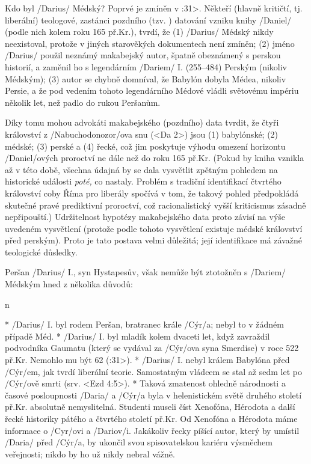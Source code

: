 
 {Kdo byl \x/Darius/ Médský?}
Poprvé je zmíněn v :31>. Někteří (hlavně kritičtí, tj. liberální) teologové, zastánci pozdního (tzv. ) datování vzniku knihy \x/Daniel/ (podle nich kolem roku 165 př.Kr.),  tvrdí, že
(1) \x/Darius/ Médský nikdy neexistoval, protože v jiných starověkých dokumentech není zmíněn; (2) jméno \x/Darius/ použil neznámý makabejský autor, špatně obeznámený s perskou
historií, a zaměnil ho s legendárním \x/Dariem/ I. (255--484) Perským (nikoliv Médským); (3) autor se chybně domníval, že Babylón dobyla Médea, nikoliv Persie, a že pod vedením tohoto
legendárního  Médové vládli světovému impériu několik let, než padlo do rukou Peršanům.

Díky tomu mohou advokáti makabejského (pozdního) data tvrdit, že čtyři království z \x/Nabuchodonozor/ova snu (<Da 2>) jsou (1) babylónské; (2) médské; (3) perské a (4) řecké, což
jim poskytuje výhodu omezení horizontu \x/Daniel/ových proroctví ne dále než do roku 165 př.Kr. (Pokud by kniha vznikla až v této době, všechna údajná   by se dala vysvětlit zpětným pohledem na historické události {\it poté,\/} co nastaly. Problém s tradiční identifikací čtvrtého království coby Říma pro liberály spočívá v tom, že takový pohled předpokládá skutečné pravé prediktivní proroctví, což racionalistický vyšší kriticismus zásadně nepřipouští.)
Udržitelnost hypotézy makabejského data proto závisí na výše uvedeném vysvětlení  (protože podle tohoto vysvětlení existuje médské království před perským).
Proto je tato postava velmi důležitá; její identifikace má závažné teologické důsledky.

Peršan \x/Darius/ I., syn Hystapesův, však nemůže být ztotožněn  s \x/Dariem/ Médským hned z několika důvodů:

\begitems \style n

* \x/Darius/ I. byl rodem Peršan, bratranec krále \x/Cýr/a; nebyl to v žádném případě Méd.
* \x/Darius/ I. byl mladík kolem dvaceti let, když zavraždil podvodníka Gaumatu (který se vydával za \x/Cýr/ova syna Smerdise) v roce 522 př.Kr.  Nemohlo mu být 62 (:31>). 
* \x/Darius/ I. nebyl králem Babylóna před \x/Cýr/em, jak tvrdí liberální teorie. Samostatným vládcem se stal až sedm let po \x/Cýr/ově smrti (srv. <Ezd 4:5>).
* Taková zmatenost ohledně národnosti a časové posloupnosti \x/Daria/ a \x/Cýr/a byla v helenistickém světě druhého století př.Kr. absolutně nemyslitelná.
Studenti museli číst Xenofóna,  Hérodota a další řecké historiky pátého a čtvrtého století př.Kr. Od Xenofóna a Hérodota máme informace o \x/Cyr/ovi a \x/Dariov/i.
Jakákoliv řecky píšící autor, který by umístil \x/Daria/ před \x/Cýr/a, by ukončil svou spisovatelskou kariéru výsměchem veřejnosti; nikdo by ho už nikdy nebral vážně.  

